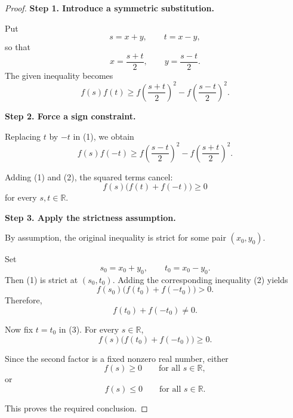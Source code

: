 
\begin{dlsummary}[title={\bfseries Solution 26. IMO 2023 Shortlist -- Algebra A2},breakable]

\begin{proof}
\textbf{Step 1. Introduce a symmetric substitution.}

Put
\[
s=x+y,\qquad t=x-y,
\]
so that
\[
x=\frac{s+t}{2},\qquad
y=\frac{s-t}{2}.
\]
The given inequality becomes
\[
f(s)f(t)\geq
f\left(\frac{s+t}{2}\right)^2
-f\left(\frac{s-t}{2}\right)^2.
\tag{1}
\]

\medskip
\noindent
\textbf{Step 2. Force a sign constraint.}

Replacing $t$ by $-t$ in (1), we obtain
\[
f(s)f(-t)\geq
f\left(\frac{s-t}{2}\right)^2
-f\left(\frac{s+t}{2}\right)^2.
\tag{2}
\]

Adding (1) and (2), the squared terms cancel:
\[
\boxed{
f(s)\bigl(f(t)+f(-t)\bigr)\geq0
}
\tag{3}
\]
for every $s,t\in\mathbb R$.

\medskip
\noindent
\textbf{Step 3. Apply the strictness assumption.}

By assumption, the original inequality is strict
for some pair $(x_0,y_0)$.

Set
\[
s_0=x_0+y_0,\qquad t_0=x_0-y_0.
\]
Then (1) is strict at $(s_0,t_0)$.
Adding the corresponding inequality (2) yields
\[
f(s_0)\bigl(f(t_0)+f(-t_0)\bigr)>0.
\]
Therefore,
\[
\boxed{f(t_0)+f(-t_0)\neq0.}
\]

Now fix $t=t_0$ in (3). For every
$s\in\mathbb R$,
\[
f(s)\bigl(f(t_0)+f(-t_0)\bigr)\geq0.
\]

Since the second factor is a fixed nonzero
real number, either
\[
f(s)\geq0\qquad\text{for all }s\in\mathbb R,
\]
or
\[
f(s)\leq0\qquad\text{for all }s\in\mathbb R.
\]

This proves the required conclusion.
\end{proof}

\end{dlsummary}